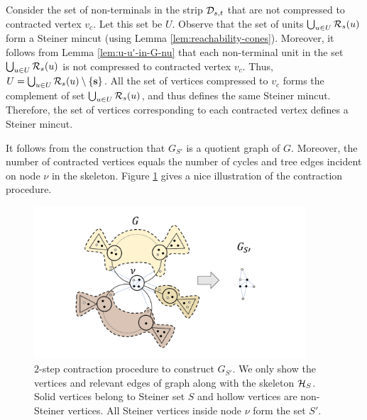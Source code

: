 
Consider the set of non-terminals in the strip ${\cal D}_{s,t}$ that are not compressed to contracted vertex $v_c$. Let this set be $U$. Observe that the set of units $\bigcup_{u\in U} {\cal R}_s(u)$ form a Steiner mincut (using Lemma \ref{lem:reachability-cones}). Moreover, it follows from Lemma \ref{lem:u-u'-in-G-nu} that each non-terminal unit in the set $\bigcup_{u\in U} {\cal R}_s(u)$ is not compressed to contracted vertex $v_c$. Thus, $U = \bigcup_{u\in U} {\cal R}_s(u) \setminus \{\mathbf{s}\}$. All the set of vertices compressed to $v_c$ forms the complement of set $\bigcup_{u\in U} {\cal R}_s(u)$, and thus defines the same Steiner mincut. Therefore, the set of vertices corresponding to each contracted vertex defines a Steiner mincut.

It follows from the construction that $G_{S'}$ is a quotient graph of $G$. Moreover, the number of contracted vertices equals the number of cycles and tree edges incident on node $\nu$ in the skeleton. Figure \ref{fig:image-contraction} gives a nice illustration of the contraction procedure.

\begin{figure}
    \centering
    \includegraphics[width=0.9\textwidth]{src/images/image_contraction.pdf}{}
    \caption{$2$-step contraction procedure to construct $G_{S'}$. We only show the vertices and relevant edges of graph along with the skeleton ${\cal H}_S$. Solid vertices belong to Steiner set $S$ and hollow vertices are non-Steiner vertices. All Steiner vertices inside node $\nu$ form the set $S'$.}
    \label{fig:image-contraction}
\end{figure}

